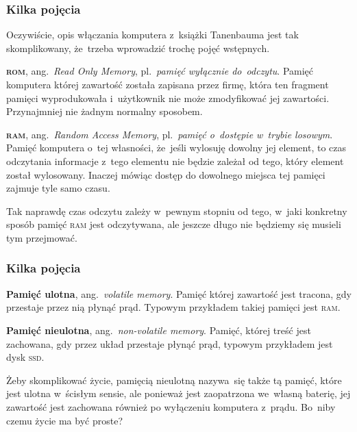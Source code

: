 \documentclass[10pt,t]{beamer}
\begin{document}
\begin{frame}
  \frametitle{Kilka pojęcia}


  Oczywiście, opis włączania komputera z~książki Tanenbauma jest tak
  skomplikowany, że~trzeba wprowadzić trochę pojęć wstępnych.

  \textbf{\textsc{rom}}, ang.~\textit{Read Only Memory}, pl.~\textit{pamięć
    wyłącznie do~odczytu}. Pamięć komputera której zawartość została
  zapisana przez firmę, która ten fragment pamięci wyprodukowała
  i~użytkownik nie może zmodyfikować jej zawartości. Przynajmniej nie żadnym
  normalny sposobem.

  \textbf{\textsc{ram}}, ang.~\textit{Random Access Memory},
  pl.~\textit{pamięć o~dostępie w~trybie losowym}. Pamięć komputera o~tej
  własności, że~jeśli wylosuję dowolny jej element, to czas odczytania
  informacje z~tego elementu nie będzie zależał od tego, który element
  został wylosowany. Inaczej mówiąc dostęp do dowolnego miejsca tej pamięci
  zajmuje tyle samo czasu.

  Tak naprawdę czas odczytu zależy w~pewnym stopniu od tego, w~jaki
  konkretny sposób pamięć \textsc{ram} jest odczytywana, ale jeszcze długo
  nie będziemy się musieli tym przejmować.

\end{frame}





\begin{frame}
  \frametitle{Kilka pojęcia}


  \textbf{Pamięć ulotna}, ang.~\textit{volatile memory}. Pamięć której
  zawartość jest tracona, gdy przestaje przez nią płynąć prąd. Typowym
  przykładem takiej pamięci jest \textsc{ram}.

  \textbf{Pamięć nieulotna}, ang.~\textit{non-volatile memory}. Pamięć,
  której treść jest zachowana, gdy przez układ przestaje płynąć prąd,
  typowym przykładem jest dysk \textsc{ssd}.

  Żeby skomplikować życie, pamięcią nieulotną nazywa~się także tą pamięć,
  które jest ulotna w~ścisłym sensie, ale ponieważ jest zaopatrzona
  we~własną baterię, jej zawartość jest zachowana również po wyłączeniu
  komputera z~prądu. Bo~niby czemu życie ma być proste?

\end{frame}
\end{document}
